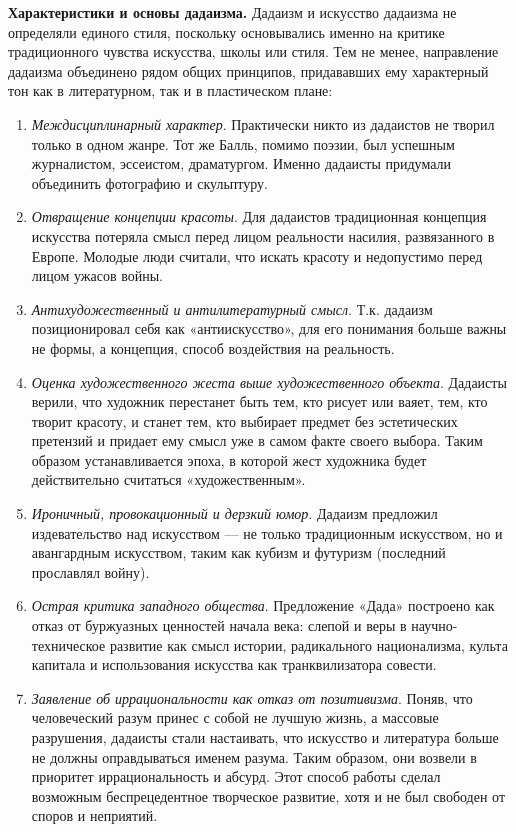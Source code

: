 \textbf{Характеристики и основы дадаизма.}
Дадаизм и искусство дадаизма не определяли единого стиля, поскольку основывались именно на критике традиционного чувства искусства, школы или стиля. Тем не менее, направление дадаизма объединено рядом общих принципов, придававших ему характерный тон как в литературном, так и в пластическом плане:
\begin{enumerate}
    \item \textit{Междисциплинарный характер}. Практически никто из дадаистов не творил только в одном жанре. Тот же Балль, помимо поэзии, был успешным журналистом, эссеистом, драматургом. Именно дадаисты придумали объединить фотографию и скульптуру.
    \item \textit{Отвращение концепции красоты}. Для дадаистов традиционная концепция искусства потеряла смысл перед лицом реальности насилия, развязанного в Европе. Молодые люди считали, что искать красоту и  недопустимо перед лицом ужасов войны.
    \item \textit{Антихудожественный и антилитературный смысл}. Т.к. дадаизм позиционировал себя как «антиискусство», для его понимания больше важны не формы, а концепция, способ воздействия на реальность.
    \item \textit{Оценка художественного жеста выше художественного объекта}. Дадаисты верили, что художник перестанет быть тем, кто рисует или ваяет, тем, кто творит красоту, и станет тем, кто выбирает предмет без эстетических претензий и придает ему смысл уже в самом факте своего выбора. Таким образом устанавливается эпоха, в которой жест художника будет действительно считаться «художественным».
    \item \textit{Ироничный, провокационный и дерзкий юмор}. Дадаизм предложил  издевательство над искусством --- не только традиционным искусством, но и авангардным искусством, таким как кубизм и футуризм (последний прославлял войну).
    \item \textit{Острая критика западного общества}. Предложение «Дада» построено как отказ от буржуазных ценностей начала века: слепой и  веры в научно-техническое развитие как смысл истории, радикального национализма, культа капитала и использования искусства как транквилизатора совести.
    \item \textit{Заявление об иррациональности как отказ от позитивизма}. Поняв, что человеческий разум принес с собой не лучшую жизнь, а массовые разрушения, дадаисты стали настаивать, что искусство и литература больше не должны оправдываться именем разума. Таким образом, они возвели в приоритет иррациональность и абсурд. Этот способ работы сделал возможным беспрецедентное творческое развитие, хотя и не был свободен от споров и неприятий.

\end{enumerate}
